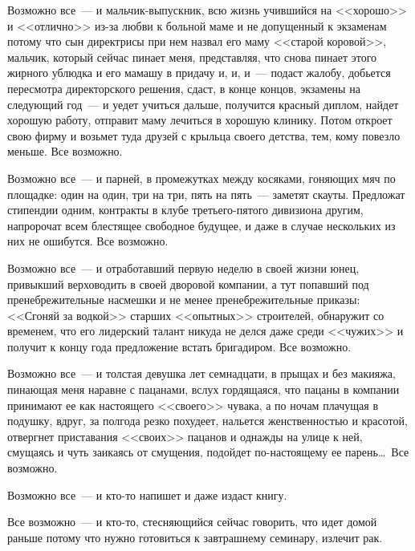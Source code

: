 Возможно все~--- и мальчик-выпускник, всю жизнь учившийся на <<хорошо>> и 
<<отлично>> из-за любви к больной маме и не допущенный к экзаменам потому что сын 
директрисы при нем назвал его маму <<старой коровой>>, мальчик, который сейчас пинает 
меня, представляя, что снова пинает этого жирного ублюдка и его мамашу в придачу и, 
и, и~--- подаст жалобу, добьется пересмотра директорского решения, сдаст, в конце 
концов, экзамены на следующий год~--- и уедет учиться дальше, получится красный 
диплом, найдет хорошую работу, отправит маму лечиться в хорошую клинику. Потом 
откроет свою фирму и возьмет туда друзей с крыльца своего детства, тем, кому 
повезло меньше. Все возможно.

Возможно все~--- и парней, в промежутках между косяками, гоняющих мяч по 
площадке: один на один, три на три, пять на пять~--- заметят скауты. Предложат стипендии 
одним, контракты в клубе третьего-пятого дивизиона другим, напророчат всем 
блестящее свободное будущее, и даже в случае нескольких из них не ошибутся. Все 
возможно.

Возможно все~--- и отработавший первую неделю в своей жизни юнец, привыкший 
верховодить в своей дворовой компании, а тут попавший под пренебрежительные 
насмешки и не менее пренебрежительные приказы: <<Сгоняй за водкой>> старших 
<<опытных>> строителей, обнаружит со временем, что его лидерский талант никуда 
не делся даже среди <<чужих>> и получит к концу года предложение встать 
бригадиром. Все возможно.

Возможно все~--- и толстая девушка лет семнадцати, в прыщах и без макияжа, 
пинающая меня наравне с пацанами, вслух гордящаяся, что пацаны в компании 
принимают ее как настоящего <<своего>> чувака, а по ночам плачущая в подушку, 
вдруг, за полгода резко похудеет, нальется женственностью и красотой, отвергнет 
приставания <<своих>> пацанов и однажды на улице к ней, смущаясь и чуть 
заикаясь от смущения, подойдет по-настоящему ее парень\ldots\ Все возможно.

Возможно все~--- и кто-то напишет и даже издаст книгу.

Все возможно~--- и кто-то, стесняющийся сейчас говорить, что идет домой раньше 
потому что нужно готовиться к завтрашнему семинару, излечит рак.

